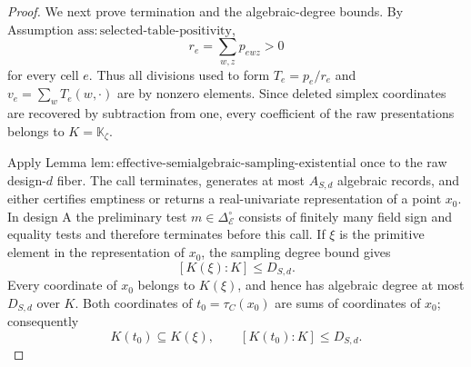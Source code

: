 \documentclass{article}
\begin{document}
\begin{proof}
We next prove termination and the algebraic-degree bounds.  By Assumption \(\mathrm{ass{:}selected\text{-}table\text{-}positivity}\),
\[
r_e=\sum_{w,z}p_{ewz}>0
\]
for every cell \(e\).  Thus all divisions used to form \(T_e=p_e/r_e\) and \(v_e=\sum_wT_e(w,\cdot)\) are by nonzero elements.  Since deleted simplex coordinates are recovered by subtraction from one, every coefficient of the raw presentations belongs to \(K=\mathbb K_{\zeta}\).

Apply Lemma \(\mathrm{lem{:}effective\text{-}semialgebraic\text{-}sampling\text{-}existential}\) once to the raw design-\(d\) fiber.  The call terminates, generates at most \(A_{S,d}\) algebraic records, and either certifies emptiness or returns a real-univariate representation of a point \(x_0\).  In design A the preliminary test \(m\in\Delta_{\mathcal E}^{\circ}\) consists of finitely many field sign and equality tests and therefore terminates before this call.  If \(\xi\) is the primitive element in the representation of \(x_0\), the sampling degree bound gives
\[
[K(\xi):K]\le D_{S,d}.                                      \tag{7}
\]
Every coordinate of \(x_0\) belongs to \(K(\xi)\), and hence has algebraic degree at most \(D_{S,d}\) over \(K\).  Both coordinates of \(t_0=\tau_C(x_0)\) are sums of coordinates of \(x_0\); consequently
\[
K(t_0)\subseteq K(\xi),
\qquad [K(t_0):K]\le D_{S,d}.                              \tag{8}
\]


\end{proof}
\end{document}
